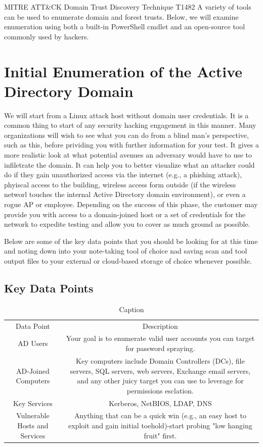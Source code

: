 MITRE ATT\&CK Domain Trust Discovery Technique T1482
A variety of tools can be used to enumerate domain and forest trusts. Below, we will examine enumeration using both a built-in PowerShell cmdlet and an open-source tool commonly used by hackers.

\section{Initial Enumeration of the Active Directory Domain}
We will start from a Linux attack host without domain user credentials. It is a common thing to start of any security hacking engagement in this manner. Many organizations will wish to see what you can do from a blind man's perspective, such as this, before prividing you with further information for your test. It gives a more realistic look at what potential avenues an adversary would have to use to infiletrate the domain.  It can help you to better visualize what an attacker could do if they gain unauthorized access via the internet (e.g., a phishing attack), phyiscal access to the building, wireless access form outside (if the wireless networl touches the internal Active Directory domain environment), or even a rogue AP or employee. Depending on the success of this phase, the customer may provide you with access to a domain-joined host or a set of credentials for the network to expedite testing and allow you to cover as much ground as possible.

Below are some of the key data points that you should be looking for at this time and noting down into your note-taking tool of choice nad saving scan and tool output files to your external or cloud-based storage of choice whenever possible.

\subsection{Key Data Points}

\begin{table}
    \centering
    \begin{tabular}{cc}
         Data Point& Description\\
         AD Users& Your goal is to enumerate valid user accounts you can target for password spraying.\\
         AD-Joined Computers& Key computers include Domain Controllers (DCs), file servers, SQL servers, web servers, Exchange email servers, and any other juicy target you can use to leverage for permissions esclation.\\
         Key Services& Kerberos, NetBIOS, LDAP, DNS\\
         Vulnerable Hosts and Services& Anything that can be a quick win (e.g., an easy host to exploit and gain initial toehold)-start probing "low hanging fruit" first.\\
    \end{tabular}
    \caption{Caption}
    \label{tab:placeholder}
\end{table}

